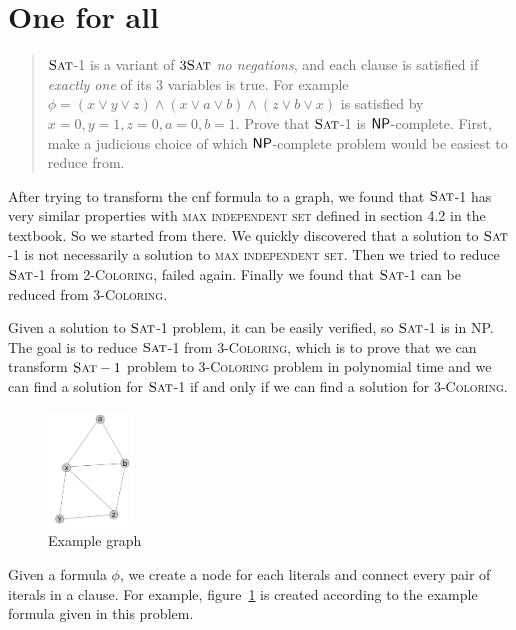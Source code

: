 \section*{One for all }
    \begin{quote}
    $\textsc{Sat}$-1 is a variant of $3\textsc{Sat}$ \emph{no negations}, and each clause is satisfied if \emph{exactly one} of its 3 variables is true.
    For example $\phi = (x \vee y \vee z) \wedge (x \vee a \vee b) \wedge (z \vee b \vee x)$ is satisfied by $x=0,y=1,z=0,a=0,b=1$.
    Prove that $\textsc{Sat}$-1 is $\mathsf{NP}$-complete.
    First, make a judicious choice of which $\mathsf{NP}$-complete problem would be easiest to reduce from.
    \end{quote}

    After trying to transform the cnf formula to a graph, we found that $\textsc{Sat}$-1 has very similar properties with \textsc{max independent set} 
    defined in section 4.2 in the textbook. So we started from there. We quickly discovered that a solution to $\textsc{Sat}$-1 is 
    not necessarily a solution to \textsc{max independent set}. Then we tried to reduce $\textsc{Sat}$-1 from 2-\textsc{Coloring}, failed again. 
    Finally we found that $\textsc{Sat}$-1 can be reduced from 3-\textsc{Coloring}.

    Given a solution to $\textsc{Sat}$-1 problem, it can be easily verified, so $\textsc{Sat}$-1 is in NP.
    The goal is to reduce $\textsc{Sat}$-1 from 3-\textsc{Coloring}, which is to prove that we can transform $\textsc{Sat}-1$ problem to
    3-\textsc{Coloring} problem in polynomial time and we can find a solution for $\textsc{Sat}$-1 if and only if we can find a 
    solution for 3-\textsc{Coloring}.

    \begin{figure}
        \centering
        \includegraphics[width=0.2\textwidth]{3_figure.png}
        \caption{Example graph}
        \label{fig:ex}
    \end{figure}

    Given a formula $\phi$, we create a node for each literals and connect every pair of iterals in a clause. 
    For example, figure~\ref{fig:ex} is created according to the example formula given in this problem.



